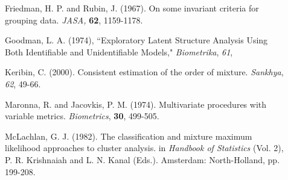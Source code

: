 \begin{description}
\item[    ] Friedman, H. P. and Rubin, J. (1967). On some invariant
criteria for grouping data. {\em JASA,} {\bf 62}, 1159-1178.
\item[    ] Goodman, L. A. (1974), ``Exploratory Latent Structure Analysis Using Both Identifiable and Unidentifiable Models," {\em Biometrika}, {\em 61},
\item[    ] Keribin, C. (2000). Consistent estimation of the order of mixture.
{\em Sankhya}, {\em 62}, 49-66.
\item[    ] Maronna, R. and Jacovkis, P. M. (1974). Multivariate procedures with variable metrics. {\em Biometrics}, {\bf 30}, 499-505.
\item[    ] McLachlan, G. J. (1982). The classification and mixture maximum likelihood approaches to cluster analysis.
in {\em Handbook of Statistics} (Vol. 2), P. R. Krishnaiah and L. N. Kanal (Eds.). Amsterdam: North-Holland, pp. 199-208.

\end{description}
